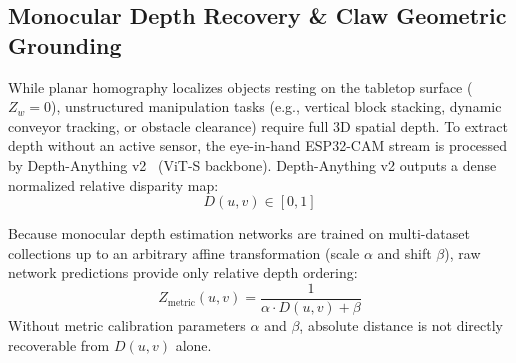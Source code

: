 \documentclass[journal]{IEEEtran}
\begin{document}
\begin{table}[!t]
\centering
\caption{Reference Hardware/Software Configuration for Reported Latency and Accuracy Figures}
\label{table_repro}
\footnotesize
{}
\end{table}

\subsection{Monocular Depth Recovery \& Claw Geometric Grounding}
While planar homography localizes objects resting on the tabletop surface ($Z_w = 0$), unstructured manipulation tasks (e.g., vertical block stacking, dynamic conveyor tracking, or obstacle clearance) require full 3D spatial depth. To extract depth without an active sensor, the eye-in-hand ESP32-CAM stream is processed by Depth-Anything v2~\cite{aria_052_yang_2024_depth} (ViT-S backbone). Depth-Anything v2 outputs a dense normalized relative disparity map:
\begin{equation}
D(u, v) \in [0, 1]
\end{equation}

Because monocular depth estimation networks are trained on multi-dataset collections up to an arbitrary affine transformation (scale $\alpha$ and shift $\beta$), raw network predictions provide only relative depth ordering:
\begin{equation}
Z_{\text{metric}}(u, v) = \frac{1}{\alpha \cdot D(u, v) + \beta}
\end{equation}
Without metric calibration parameters $\alpha$ and $\beta$, absolute distance is not directly recoverable from $D(u,v)$ alone.
\end{document}
